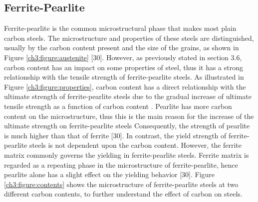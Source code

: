 \documentclass[12pt]{report}
\begin{document}
\subsection{Ferrite-Pearlite}
Ferrite-pearlite is the common microstructural phase that makes most plain carbon steels. The microstructure and properties of these steels are distinguished, usually by the carbon content present and the size of the grains, as shown in Figure \ref{ch3:figure:austenite} [30]. However, as previously stated in section 3.6, carbon content has an impact on some properties of steel, thus it has a strong relationship with the tensile strength of ferrite-pearlite steels. As illustrated in Figure \ref{ch3:figure:properties}, carbon content has a direct relationship with the ultimate strength of ferrite-pearlite steels due to the gradual increase of ultimate tensile strength as a function of carbon content \cite{cmrp2014maintenance}. 
Pearlite has more carbon content on the microstructure, thus this is the main reason for the increase of the ultimate strength on ferrite-pearlite steels \cite{bajaj2020steels} Consequently, the strength of pearlite is much higher than that of ferrite [30]. In contrast, the yield strength of ferrite-pearlite steels is not dependent upon the carbon content. However, the ferrite matrix commonly governs the yielding in ferrite-pearlite steels. Ferrite matrix is regarded as a repeating phase in the microstructure of ferrite-pearlite, hence pearlite alone has a slight effect on the yielding behavior [30]. Figure \ref{ch3:figure:contents} shows the microstructure of ferrite-pearlite steels at two different carbon contents, to further understand the effect of carbon on steels.
\end{document}
